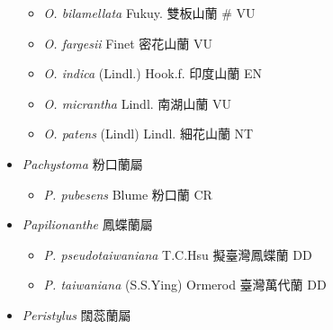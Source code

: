 \begin{itemize}
  \begin{itemize}
        \item[] \textit{O. bilamellata} Fukuy.  雙板山蘭  \# VU
        \item[] \textit{O. fargesii} Finet  密花山蘭   VU
        \item[] \textit{O. indica} (Lindl.) Hook.f.  印度山蘭   EN
        \item[] \textit{O. micrantha} Lindl.  南湖山蘭   VU
        \item[] \textit{O. patens} (Lindl) Lindl.  細花山蘭   NT
  \end{itemize}
 \item[] \textit{Pachystoma} 粉口蘭屬
                                
  \begin{itemize}
        \item[] \textit{P. pubesens} Blume  粉口蘭   CR
  \end{itemize}
 \item[] \textit{Papilionanthe} 鳳蝶蘭屬
                                
  \begin{itemize}
        \item[] \textit{P. pseudotaiwaniana} T.C.Hsu  擬臺灣鳳蝶蘭   DD
        \item[] \textit{P. taiwaniana} (S.S.Ying) Ormerod  臺灣萬代蘭   DD
  \end{itemize}
 \item[] \textit{Peristylus} 闊蕊蘭屬
                                

\end{itemize}
